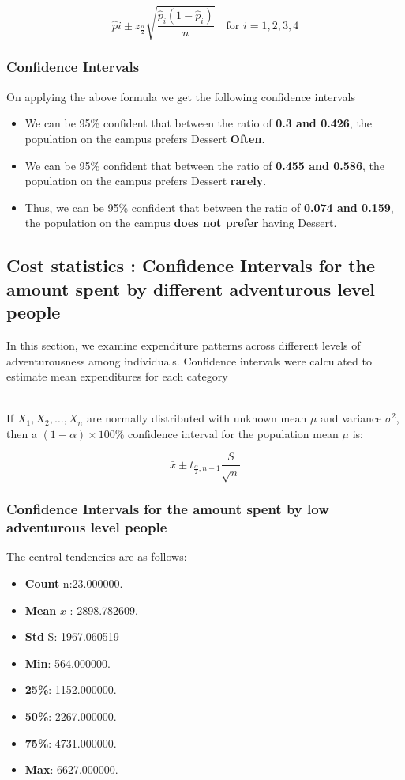 \documentclass[12pt]{article}
\begin{document}
    \[
    \hat{p}i \pm z_{\frac{\alpha}{2}} \sqrt{\frac{\hat{p}_i(1 - \hat{p}_i)}{n}}
    \quad \text{for } i = 1, 2, 3, 4
    \]
\subsubsection{Confidence Intervals}
    On applying the above formula we get the following confidence intervals
    \begin{itemize}
        \item We can be  95\% confident that between the ratio of \textbf{0.3 and 0.426}, the population on the campus prefers Dessert \textbf{Often}.
        
        \item We can be  95\% confident that between the ratio of \textbf{0.455 and 0.586}, the population on the campus prefers Dessert \textbf{rarely}.
        
        \item Thus, we can be  95\% confident that between the ratio of \textbf{0.074 and 0.159}, the population on the campus \textbf{does not prefer} having Dessert.
    \end{itemize}

\subsection{Cost statistics : Confidence Intervals for the amount spent by different adventurous level people}
In this section, we examine expenditure patterns across different levels of adventurousness among individuals. Confidence intervals were calculated to estimate mean expenditures for each category

     \\ If $X_1, X_2, \ldots, X_n$ are normally distributed with unknown mean $\mu$ and variance $\sigma^2$, then a $(1 - \alpha) \times 100\%$ confidence interval for the population mean $\mu$ is:

        \[
        \bar{x} \pm t_{\frac{\alpha}{2}, n-1} \frac{S}{\sqrt{n}}
        \]
    \subsubsection{Confidence Intervals for the amount spent by low adventurous level people}
        The central tendencies are as follows:
        \begin{itemize}
            \item \textbf{Count} n:23.000000.
            \item \textbf{Mean} $\bar{x}$ : 2898.782609.
            \item \textbf{Std} S: 1967.060519
            \item \textbf{Min}: 564.000000.
            \item \textbf{25\%}: 1152.000000.
            \item \textbf{50\%}: 2267.000000.
            \item \textbf{75\%}: 4731.000000.
            \item \textbf{Max}: 6627.000000.
        \end{itemize}
\end{document}
